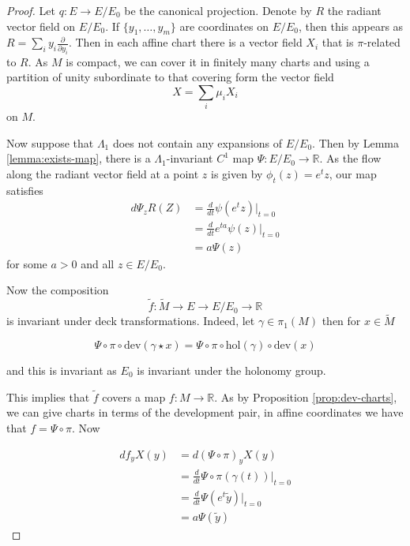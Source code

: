 \begin{proof}

    Let $q: E \to E/E_0$ be the canonical projection. Denote by $R$ the radiant
    vector field on $E/E_0$. If $\{y_1,\dots , y_m\}$ are coordinates on $E/E_0$,
    then this appears as $R = \sum_i y_i \frac{\partial}{\partial y_{i}}$. Then in
    each affine chart there is a vector field $X_i$ that is $\pi$-related to $R$.
    As $M$ is compact, we can cover it in finitely many charts and using a
    partition of unity subordinate to that covering form the vector field
    \[X = \sum_{i}\mu_i X_i\]
    on $M$.

    Now suppose that $\Lambda_1$ does not contain any expansions of $E/E_0$. Then
    by Lemma \ref{lemma:exists-map}, there is a $\Lambda_1$-invariant $C^1$ map
    $\Psi: E/E_0 \to \mathbb{R}$. As the flow along the radiant vector field at a
    point $z$ is given by $\phi_t(z) = e^tz$, our map satisfies
    \begin{align*}
        d\Psi_z R(Z) & = \frac{d}{dt}\psi(e^tz)|_{t=0}     \\
                     & = \frac{d}{dt} e^{ta}\psi(z)|_{t=0} \\
                     & = a\Psi(z)
    \end{align*}
    for some $a>0$ and all $z\in E/E_0$.

    Now the composition
    \[\tilde{f}: \tilde{M} \to E \to E/E_0 \to \mathbb{R}\]
    is invariant under deck transformations. Indeed, let $\gamma \in \pi_1(M)$ then
    for $x \in \tilde{M}$

    \[\Psi\circ \pi \circ \text{dev}(\gamma \star x) = \Psi\circ \pi \circ \text{hol}(\gamma)\circ \text{dev}(x)\]

    and this is invariant as $E_0$ is invariant under the holonomy group.

    This implies that $\tilde{f}$ covers a map $f: M \to \mathbb{R}$. As by
    Proposition \ref{prop:dev-charts}, we can give charts in terms of the
    development pair, in affine coordinates we have that $f = \Psi \circ \pi$. Now

    \begin{align*}
        df_y X(y) & = d(\Psi \circ \pi)_y X(y)                      \\
                  & = \frac{d}{dt}\Psi \circ \pi (\gamma(t))|_{t=0} \\
                  & = \frac{d}{dt}\Psi(e^{t}\tilde{y})|_{t=0}       \\
                  & = a\Psi(\tilde{y})
    \end{align*}


\end{proof}
